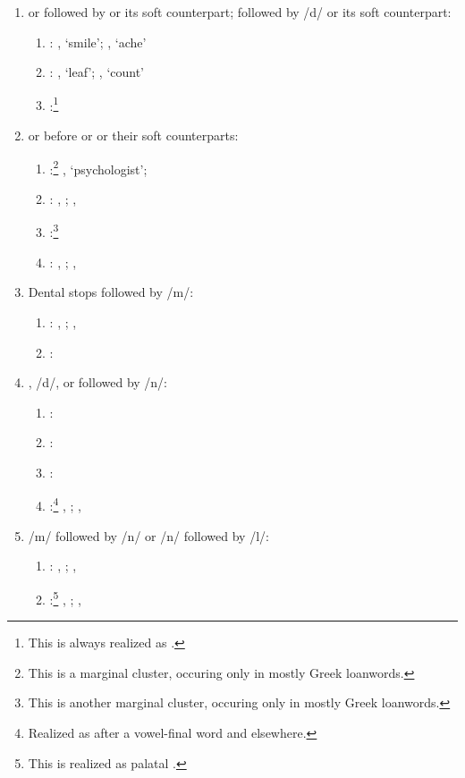 \begin{enumerate}
\begin{enumerate}
		\end{enumerate}
	\item {} or  followed by  or its soft counterpart;  followed by /d/ or its soft counterpart:
		\begin{enumerate}
			\item {}:  , `smile';  , `ache'
			\item {}:  , `leaf';  , `count'
			\item {}:\footnote{This is always realized as .}
		\end{enumerate}
	\item {} or  before  or  or their soft counterparts:
	\begin{enumerate}
		\item {}:\footnote{This is a marginal cluster, occuring only in mostly Greek loanwords.}  , `psychologist';
		\item {}:  , ;  , 
		\item {}:\footnote{This is another marginal cluster, occuring only in mostly Greek loanwords.}
		\item {}:  , ;  , 
	\end{enumerate}
	\item Dental stops followed by /m/:
	\begin{enumerate}
		\item {}:  , ;  , 
		\item {}:
	\end{enumerate}
		\item {}, /d/,  or   followed by /n/:
	\begin{enumerate}
		\item {}:
		\item {}:
		\item {}:
		\item {}:\footnote{Realized as  after a vowel-final word and  elsewhere.}  , ;  , 
	\end{enumerate}

		\item /m/ followed by /n/ or /n/ followed by /l/:
	\begin{enumerate}
		\item {}:  , ;  , 
		\item {}:\footnote{This is realized as palatal .}  , ;  , 
	\end{enumerate}


\end{enumerate}
